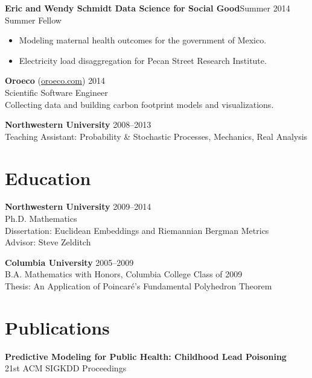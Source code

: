\documentclass[margin,line]{resume}
\begin{document}
\begin{resume}
	{\bf Eric and Wendy Schmidt Data Science for Social Good}\hfill{Summer 2014}\\
	Summer Fellow
	\begin{itemize}
		\item Modeling maternal health outcomes for the government of Mexico.
		\item Electricity load disaggregation for Pecan Street Research Institute.
	\end{itemize}

	{\bf Oroeco} (\href{http://www.oroeco.com}{oroeco.com}) \hfill {2014} \\
	Scientific Software Engineer \\
	Collecting data and building carbon footprint models and visualizations. 

	{\bf Northwestern University} \hfill {2008--2013}\\
	Teaching Assistant: Probability \& Stochastic Processes, Mechanics, Real Analysis%
	

    \section{\mysidestyle Education}
	
	{\bf Northwestern University} \hfill {2009--2014} \\%
	Ph.D. Mathematics \\
	Dissertation: Euclidean Embeddings and Riemannian Bergman Metrics \\
	Advisor: Steve Zelditch 

	{\bf Columbia University} \hfill {2005--2009} \\%
    B.A. Mathematics with Honors, Columbia College Class of 2009 \\
	Thesis: An Application of Poincar\'e's Fundamental Polyhedron Theorem

	
	\section{\mysidestyle Publications}
	{\bf Predictive Modeling for Public Health: Childhood Lead Poisoning} \\
    21st ACM SIGKDD Proceedings


\end{resume}
\end{document}
